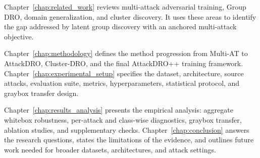 Chapter~\ref{chap:related_work} reviews multi-attack adversarial training,
Group DRO, domain generalization, and cluster discovery.  It uses these areas to
identify the gap addressed by latent group discovery with an anchored
multi-attack objective.

Chapter~\ref{chap:methodology} defines the method progression from Multi-AT to
AttackDRO, Cluster-DRO, and the final AttackDRO++ training framework.
Chapter~\ref{chap:experimental_setup} specifies the dataset, architecture,
source attacks, evaluation suite, metrics, hyperparameters, statistical protocol,
and graybox transfer design.

Chapter~\ref{chap:results_analysis} presents the empirical analysis: aggregate
whitebox robustness, per-attack and class-wise diagnostics, graybox transfer,
ablation studies, and supplementary checks.  Chapter~\ref{chap:conclusion}
answers the research questions, states the limitations of the evidence, and
outlines future work needed for broader datasets, architectures, and attack
settings.
